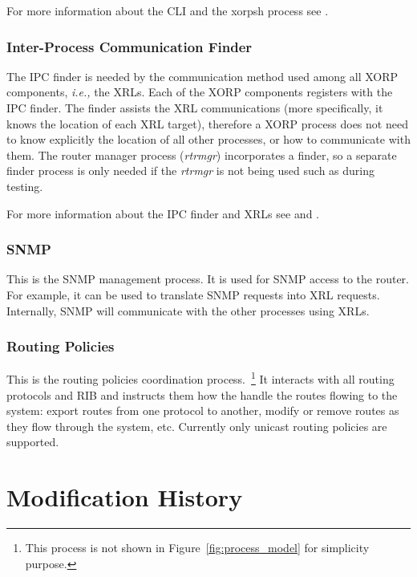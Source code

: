 \documentclass[11pt]{article}
\newcommand{\ie}{\emph{i.e.,}\xspace}
\begin{document}
For more information about the CLI and the xorpsh process see
\cite{xorp:rtrmgr}.

\subsubsection{Inter-Process Communication Finder}

The IPC finder is needed by the communication method used among all
XORP components, \ie the XRLs. Each of the XORP components registers
with the IPC finder. The finder assists the XRL communications (more
specifically, it knows the location of each XRL target), therefore a
XORP process does not need to know explicitly the location of all
other processes, or how to communicate with them.  The router manager
process ({\em rtrmgr}) incorporates a finder, so a separate finder process
is only needed if the {\em rtrmgr} is not being used such as during testing.

For more information about the IPC finder and XRLs see
\cite{xorp:xrl} and \cite{xorp:xrl_interfaces}.

\subsubsection{SNMP}

This is the SNMP management process. It is used for SNMP access to the
router. For example, it can be used to translate SNMP requests into XRL
requests. Internally, SNMP will communicate with the other processes
using XRLs.

\subsubsection{Routing Policies}

This is the routing policies coordination process.~\footnote{This
process is not shown in Figure~\ref{fig:process_model} for simplicity
purpose.} It interacts with all routing protocols and RIB and instructs
them how the handle the routes flowing to the system: export routes from
one protocol to another, modify or remove routes as they flow through
the system, etc.  Currently only unicast routing policies are supported.

\appendix
\section{Modification History}
\end{document}

